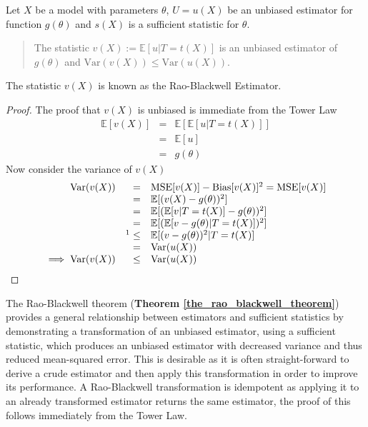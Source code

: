 \documentclass[11pt,a4paper]{article}
\newcommand*{\expect}{\mathbb{E}}
\theoremstyle{break}
\begin{document}
  \begin{box_theorem}\label{the_rao_blackwell_theorem}
    Let $X$ be a model with parameters $\theta$, $U=u(X)$ be an unbiased estimator for function $g(\theta)$ and $s(X)$ is a sufficient statistic for $\theta$.
    \begin{quote}
      The statistic $v(X):=\expect[u|T=t(X)]$ is an unbiased estimator of $g(\theta)$ and $\text{Var}(v(X))\leq\text{Var}(u(X))$.
    \end{quote}
    The statistic $v(X)$ is known as the Rao-Blackwell Estimator.
    \begin{proof}
      The proof that $v(X)$ is unbiased is immediate from the Tower Law
      \[\begin{array}{rcl}
        \expect[v(X)]&=&\expect[\expect[u|T=t(X)]]\\
        &=&\expect[u]\\
        &=&g(\theta)
      \end{array}\]
      Now consider the variance of $v(X)$
      \[\begin{array}{rrl}
        \text{Var}(v(X))&=&\text{MSE}[v(X)]-\text{Bias}[v(X)]^2=\text{MSE}[v(X)]\\
        &=&\expect[(v(X)-g(\theta))^2]\\
        &=&\expect[(\expect[v|T=t(X)]-g(\theta))^2]\\
        &=&\expect[(\expect[v-g(\theta)|T=t(X)])^2]\\
        &\footnotemark\leq&\expect[(v-g(\theta))^2|T=t(X)]\\
        &=&\text{Var}(u(X))\\
        \implies\text{Var}(v(X))&\leq&\text{Var}(u(X))
      \end{array}\]
      \footnotetext{$\text{Var}(X)=\expect[X^2]-\expect[X]^2\implies\expect[X^2]\geq\expect[X]^2$}
    \end{proof}
  \end{box_theorem}

  \par The Rao-Blackwell theorem (\textbf{Theorem \ref{the_rao_blackwell_theorem}}) provides a general relationship between estimators and sufficient statistics by demonstrating a transformation of an unbiased estimator, using a sufficient statistic, which produces an unbiased estimator with decreased variance and thus reduced mean-squared error.
  This is desirable as it is often straight-forward to derive a crude estimator and then apply this transformation in order to improve its performance. %
  A Rao-Blackwell transformation is idempotent as applying it to an already transformed estimator returns the same estimator, the proof of this follows immediately from the Tower Law.
\end{document}
